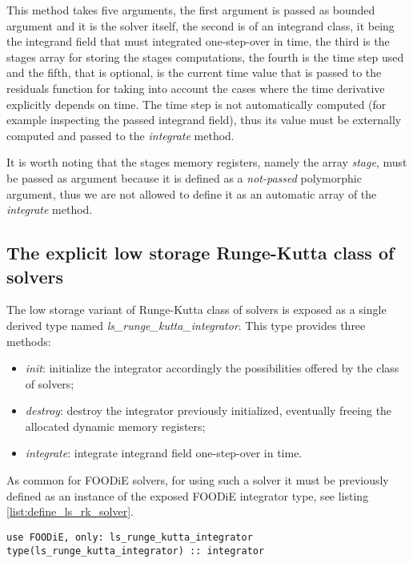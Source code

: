 This method takes five arguments, the first argument is passed as bounded argument and it is the solver itself, the second is of an integrand class, it being the integrand field that must integrated one-step-over in time, the third is the stages array for storing the stages computations, the fourth is the time step used and the fifth, that is optional, is the current time value that is passed to the residuals function for taking into account the cases where the time derivative explicitly depends on time. The time step is not automatically computed (for example inspecting the passed integrand field), thus its value must be externally computed and passed to the \emph{integrate} method.

It is worth noting that the stages memory registers, namely the array \emph{stage}, must be passed as argument because it is defined as a \emph{not-passed} polymorphic argument, thus we are not allowed to define it as an automatic array of the \emph{integrate} method.

\subsection{The explicit low storage Runge-Kutta class of solvers}\label{subsec:solver_ls_rk}

The low storage variant of Runge-Kutta class of solvers is exposed as a single derived type named \emph{ls\_runge\_kutta\_integrator}. This type provides three methods:

\begin{itemize}
  \item \emph{init}: initialize the integrator accordingly the possibilities offered by the class of solvers;
  \item \emph{destroy}: destroy the integrator previously initialized, eventually freeing the allocated dynamic memory registers;
  \item \emph{integrate}: integrate integrand field one-step-over in time.
  \end{itemize}

As common for FOODiE solvers, for using such a solver it must be previously defined as an instance of the exposed FOODiE integrator type, see listing \ref{list:define_ls_rk_solver}.

\begin{lstlisting}[firstnumber=1,style=code,caption={definition of an explicit low storage Runge-Kutta integrator},label={list:define_ls_rk_solver}]
use FOODiE, only: ls_runge_kutta_integrator
type(ls_runge_kutta_integrator) :: integrator
\end{lstlisting}

